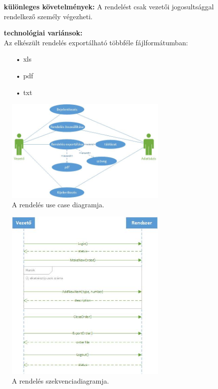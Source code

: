 \documentclass[12pt]{article}\usepackage[left=20mm,right=20mm,top=15mm,bottom=20mm]{geometry}
\begin{document}
\begin{itemize}
\item[] \textbf{különleges követelmények: } A rendelést csak vezetői jogosultsággal rendelkező személy végezheti.

\item[] \textbf{technológiai variánsok: } \\Az elkészült rendelés exportálható többféle fájlformátumban:
\vspace*{-3mm}
\begin{itemize}
\item[•] xls
\item[•] pdf
\item[•] txt
\end{itemize}
\end{itemize} 

\begin{figure}[!h]
    \centering
        \includegraphics[width=0.7\textwidth]{figures/rendeles_UC.jpg}
        \caption{A rendelés use case diagramja.}
\end{figure}

\begin{figure}[!h]
    \centering
        \includegraphics[width=0.7\textwidth]{figures/rendeles_SD.jpg}
        \caption{A rendelés szekvenciadiagramja.}
\end{figure}
\end{document}
